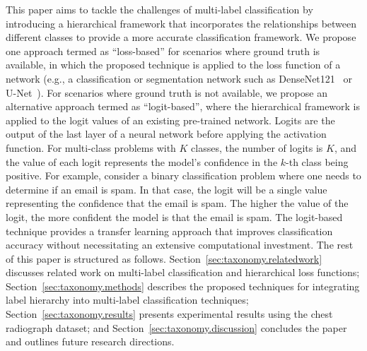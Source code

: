 This paper aims to tackle the challenges of multi-label classification by introducing a hierarchical framework that incorporates the relationships between different classes to provide a more accurate classification framework. We propose one approach termed as ``loss-based'' for scenarios where ground truth is available, in which the proposed technique is applied to the loss function of a network (e.g., a classification or segmentation network such as DenseNet121~\cite{huang_Densely_2017} or U-Net~\cite{ronneberger_UNet_2015}). For scenarios where ground truth is not available, we propose an alternative approach termed as ``logit-based'', where the hierarchical framework is applied to the logit values of an existing pre-trained network. Logits are the output of the last layer of a neural network before applying the activation function. For multi-class problems with $K$ classes, the number of logits is $K$, and the value of each logit represents the model's confidence in the $k$-th class being positive. For example, consider a binary classification problem where one needs to determine if an email is spam. In that case, the logit will be a single value representing the confidence that the email is spam. The higher the value of the logit, the more confident the model is that the email is spam.
The logit-based technique provides a transfer learning approach that improves classification accuracy without necessitating an extensive computational investment. The rest of this paper is structured as follows. Section~\ref{sec:taxonomy.relatedwork} discusses related work on multi-label classification and hierarchical loss functions; Section~\ref{sec:taxonomy.methods} describes the proposed techniques for integrating label hierarchy into multi-label classification techniques; Section~\ref{sec:taxonomy.results} presents experimental results using the chest radiograph dataset; and Section~\ref{sec:taxonomy.discussion} concludes the paper and outlines future research directions.
